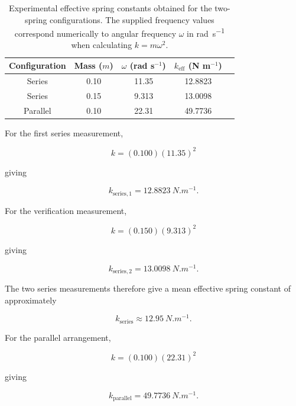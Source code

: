 \documentclass[12pt,a4paper]{article}
\begin{document}
\begin{table}[H]
\centering
\caption{Experimental effective spring constants obtained for the two-spring configurations. The supplied frequency values correspond numerically to angular frequency $\omega$ in \si{rad.s^{-1}} when calculating $k=m\omega^2$.}
\begin{tabular}{ccccc}
\toprule
Configuration & Mass ($m$) & $\omega$ (rad s$^{-1}$) & $k_{\mathrm{eff}}$ (N m$^{-1}$) \\
\midrule
Series & 0.10 & 11.35 & 12.8823 \\
Series & 0.15 & 9.313 & 13.0098 \\
Parallel & 0.10 & 22.31 & 49.7736 \\
\bottomrule
\end{tabular}
\end{table}

For the first series measurement,

\begin{equation}
k=(0.100)(11.35)^2
\end{equation}

giving

\begin{equation}
\boxed{
k_{\mathrm{series,1}}=12.8823\ \si{N.m^{-1}}
}.
\end{equation}

For the verification measurement,

\begin{equation}
k=(0.150)(9.313)^2
\end{equation}

giving

\begin{equation}
\boxed{
k_{\mathrm{series,2}}=13.0098\ \si{N.m^{-1}}
}.
\end{equation}

The two series measurements therefore give a mean effective spring constant of approximately

\begin{equation}
\boxed{
k_{\mathrm{series}}\approx12.95\ \si{N.m^{-1}}
}.
\end{equation}

For the parallel arrangement, 

\begin{equation}
k=(0.100)(22.31)^2
\end{equation}

giving

\begin{equation}
\boxed{
k_{\mathrm{parallel}}=49.7736\ \si{N.m^{-1}}
}.
\end{equation}
\end{document}
